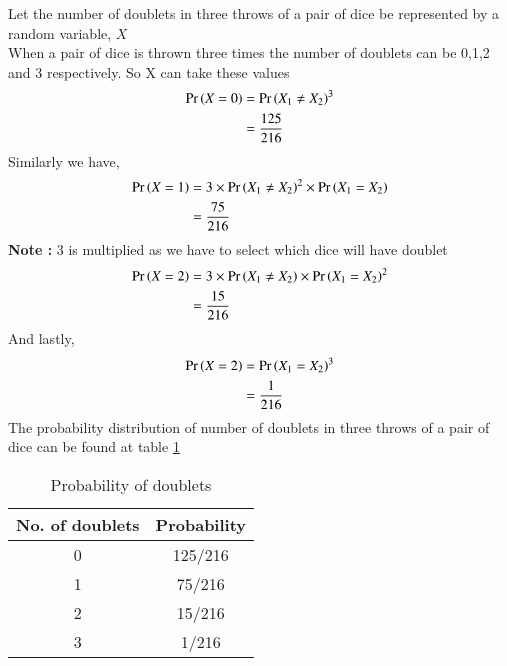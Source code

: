 Let the number of doublets in three throws of a pair of dice be represented by a random variable, $X$ \\
When a pair of dice is thrown three times the number of doublets can be 0,1,2 and 3 respectively. So X can take these values
\begin{align}
    \Pr\left(X =0\right) &= {\Pr\left(X_1 \neq X_2\right)}^3   \\
        & = \dfrac{125}{216}
\end{align}
Similarly we have, 
\begin{align}
    \Pr\left(X =1\right) &= 3 \times {\Pr\ensuremath{\left(X_1 \neq X_2\right)}}^2 \times \Pr\left(X_1 = X_2\right)   \\
        & = \dfrac{75}{216}
\end{align}
\textbf{Note :} 3 is multiplied as we have to select which dice will have doublet
\begin{align}
    \Pr\left(X =2\right) &= 3 \times \Pr\left(X_1 \neq X_2\right) \times {\Pr\ensuremath{\left(X_1 = X_2\right)}}^2 \\
        & = \dfrac{15}{216}
\end{align}
And lastly,
\begin{align}
    \Pr\left(X =2\right) &= {\Pr\left(X_1 = X_2\right)}^3   \\
        & = \dfrac{1}{216}
\end{align}
The probability distribution of number of doublets in three throws of a pair of dice can be found at table  \ref{tab:Probability of doublets} 
\begin{table}[hbt!]
\centering
\begin{tabular}{|c|c|}
\hline
\textbf{No. of doublets} & \textbf{Probability} \\ \hline
0                        & 125/216                    \\ \hline
1                        & 75/216                    \\ \hline
2                        & 15/216               \\ \hline
3                        & 1/216                    \\ \hline
\end{tabular}
\caption{Probability of doublets}
\label{tab:Probability of doublets}
\end{table}
